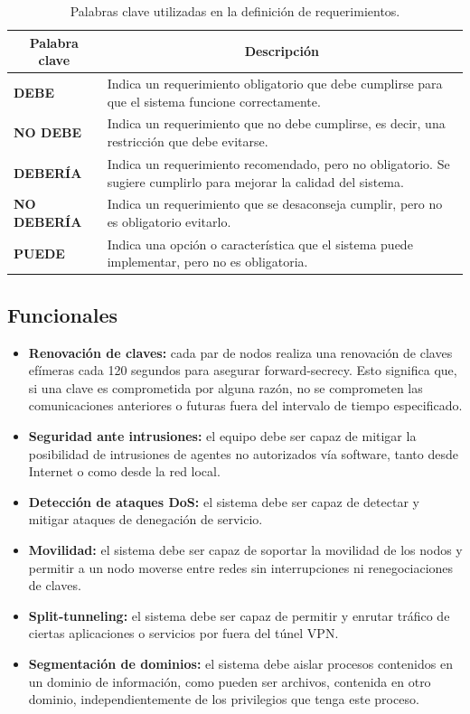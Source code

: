 \begin{table}[h!]
    \centering
    \begin{tabular}{|l|p{10cm}|}
        \hline
        \multicolumn{1}{|c|}{\textbf{Palabra clave}} & \multicolumn{1}{c|}{\textbf{Descripción}} \\
        \hline
        \textbf{DEBE} & Indica un requerimiento obligatorio que debe cumplirse para que el sistema funcione correctamente. \\
        \hline
        \textbf{NO DEBE} & Indica un requerimiento que no debe cumplirse, es decir, una restricción que debe evitarse. \\
        \hline
        \textbf{DEBERÍA} & Indica un requerimiento recomendado, pero no obligatorio. Se sugiere cumplirlo para mejorar la calidad del sistema. \\
        \hline
        \textbf{NO DEBERÍA} & Indica un requerimiento que se desaconseja cumplir, pero no es obligatorio evitarlo. \\
        \hline
        \textbf{PUEDE} & Indica una opción o característica que el sistema puede implementar, pero no es obligatoria. \\
        \hline
    \end{tabular}
    \caption{Palabras clave utilizadas en la definición de requerimientos.}
    \label{tab:palabras_clave_requerimientos}
\end{table}
\subsection{Funcionales}

\begin{itemize}
    \item \textbf{Renovación de claves:} cada par de nodos realiza una renovación de claves efímeras cada 120 segundos para asegurar forward-secrecy. Esto significa que, si una clave es comprometida por alguna razón, no se comprometen las comunicaciones anteriores o futuras fuera del intervalo de tiempo especificado.
    \item \textbf{Seguridad ante intrusiones:} el equipo debe ser capaz de  mitigar la posibilidad de intrusiones de agentes no autorizados vía software, tanto desde Internet o como desde la red local.
    \item \textbf{Detección de ataques DoS:} el sistema debe ser capaz de detectar y mitigar ataques de denegación de servicio.
    \item \textbf{Movilidad:} el sistema debe ser capaz de soportar la movilidad de los nodos y permitir a un nodo moverse entre redes sin interrupciones ni renegociaciones de claves. 
    \item \textbf{Split-tunneling:} el sistema debe ser capaz de permitir y enrutar tráfico de ciertas aplicaciones o servicios por fuera del túnel VPN. 
    \item \textbf{Segmentación de dominios: } el sistema debe aislar procesos contenidos en un dominio de información, como pueden ser archivos, contenida en otro dominio, independientemente de los privilegios que tenga este proceso.
\end{itemize}


